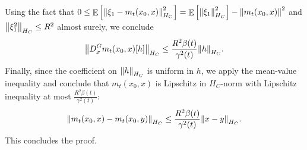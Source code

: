 Using the fact that \(0 \leq \mathop{\mathbb{E}}\qty[\norm{\xi_{1} - m_{t}(x_{0}, x)}_{H_{C}}^{2}] = \mathop{\mathbb{E}}\qty[\norm{\xi_{1}}_{H_{C}}^{2}] - \norm{m_{t}(x_{0}, x)}^{2}\) and \(\norm{\xi_{1}^{2}}_{H_{C}} \leq R^{2}\) almost surely, we conclude
\[
  \norm{D_{x}^{G} m_{t}(x_{0}, x)[h]}_{H_{C}} \leq \frac{R^{2} \beta(t)}{\gamma^{2}(t)} \norm{h}_{H_{C}}.
\]
Finally, since the coefficient on \(\norm{h}_{H_{C}}\) is uniform in \(h\), we apply the mean-value inequality and conclude that \(m_{t}(x_{0}, x)\) is Lipschitz in \(H_{C}\)-norm with Lipschitz inequality at most \(\frac{R^{2}\beta(t)}{\gamma^{2}(t)}\):
\[
  \norm{m_{t}(x_{0}, x) - m_{t}(x_{0}, y)}_{H_{C}} \leq \frac{R^{2}\beta(t)}{\gamma^{2}(t)} \norm{x - y}_{H_{C}}.
\]
This concludes the proof.